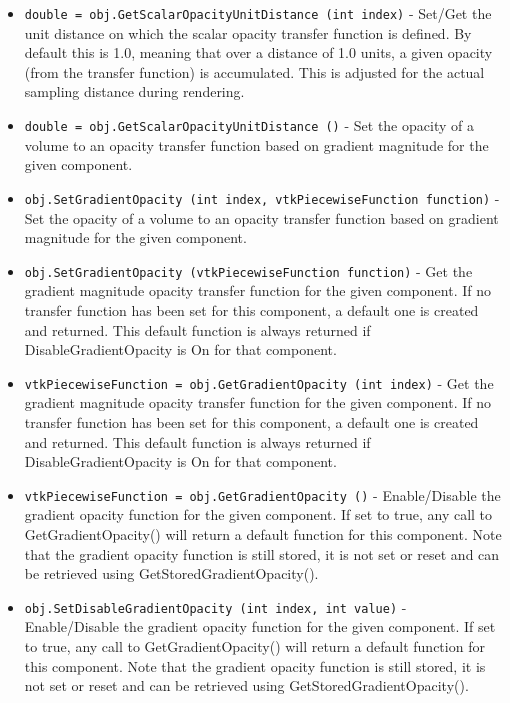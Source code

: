 \begin{itemize}
\item  \verb|double = obj.GetScalarOpacityUnitDistance (int index)| -  Set/Get the unit distance on which the scalar opacity transfer function
 is defined. By default this is 1.0, meaning that over a distance of
 1.0 units, a given opacity (from the transfer function) is accumulated.
 This is adjusted for the actual sampling distance during rendering.

\item  \verb|double = obj.GetScalarOpacityUnitDistance ()| -  Set the opacity of a volume to an opacity transfer function based
 on gradient magnitude for the given component.

\item  \verb|obj.SetGradientOpacity (int index, vtkPiecewiseFunction function)| -  Set the opacity of a volume to an opacity transfer function based
 on gradient magnitude for the given component.

\item  \verb|obj.SetGradientOpacity (vtkPiecewiseFunction function)| -  Get the gradient magnitude opacity transfer function for
 the given component.
 If no transfer function has been set for this component, a default one
 is created and returned.
 This default function is always returned if DisableGradientOpacity is On
 for that component.

\item  \verb|vtkPiecewiseFunction = obj.GetGradientOpacity (int index)| -  Get the gradient magnitude opacity transfer function for
 the given component.
 If no transfer function has been set for this component, a default one
 is created and returned.
 This default function is always returned if DisableGradientOpacity is On
 for that component.

\item  \verb|vtkPiecewiseFunction = obj.GetGradientOpacity ()| -  Enable/Disable the gradient opacity function for the given component. 
 If set to true, any call to GetGradientOpacity() will return a default
 function for this component. Note that the gradient opacity function is 
 still stored, it is not set or reset and can be retrieved using 
 GetStoredGradientOpacity().

\item  \verb|obj.SetDisableGradientOpacity (int index, int value)| -  Enable/Disable the gradient opacity function for the given component. 
 If set to true, any call to GetGradientOpacity() will return a default
 function for this component. Note that the gradient opacity function is 
 still stored, it is not set or reset and can be retrieved using 
 GetStoredGradientOpacity().


\end{itemize}
